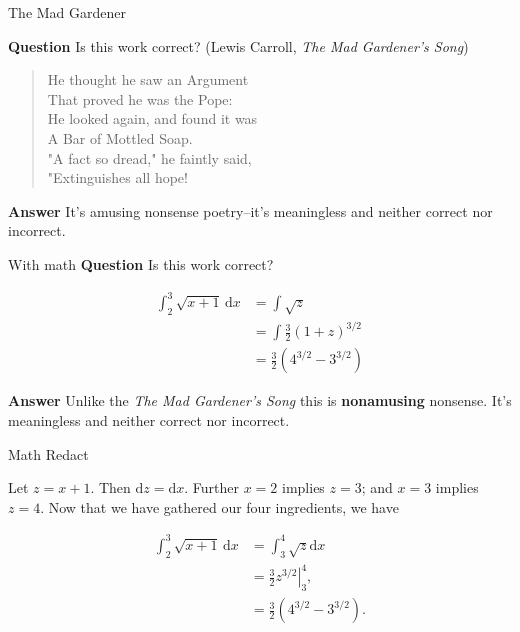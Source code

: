 \documentclass[fleqn]{beamer}
\theoremstyle{definition}
\begin{document}
\begin{frame}{The Mad Gardener}

  \textbf{Question} Is this work correct? 
   (Lewis Carroll, \emph{The Mad Gardener’s Song})

   \vspace{0.5in}
  \begin{quote}
    He thought he saw an Argument\\
  That proved he was the Pope:\\
  He looked again, and found it was\\
  A Bar of Mottled Soap.\\
  "A fact so dread," he faintly said,\\
  "Extinguishes all hope! 
  \end{quote}
 
  \vspace{0.5in}
  \textbf{Answer} It's amusing nonsense poetry--it's meaningless
  and neither correct nor incorrect.
  
\end{frame}

\begin{frame}{With math}
  \textbf{Question} Is this work correct? 

  \begin{align*}
    \int_2^3 \sqrt{x+1} \, \mathrm{d}x &=  \int\sqrt{z}\\
                                       &= \int \frac{3}{2} (1+ z)^{3/2}\\
                                       &=  \frac{3}{2} (4^{3/2} - 3^{3/2})
  \end{align*}

  \textbf{Answer} Unlike the \emph{The Mad Gardener’s Song} this is 
  \textbf{nonamusing} nonsense. It's 
  meaningless and neither correct nor incorrect.
\end{frame}

\begin{frame}{Math Redact}

  Let $z = x+1$. Then $\mathrm{d}z = \mathrm{d}x$. Further
  $x=2$ implies $z=3$; and $x=3$ implies $z=4$. Now that we
  have gathered our four ingredients, we have

\begin{align*}
    \int_2^3 \sqrt{x+1} \, \mathrm{d}x &=  \int_3^4 \sqrt{z} \mathrm{d}x\\
                                       &=  \left. \frac{3}{2} z^{3/2} \right |_{3}^4, \\
                                       &= \frac{3}{2} \left(4^{3/2} - 3^{3/2}\right).
  \end{align*}
\end{frame}
\end{document}
